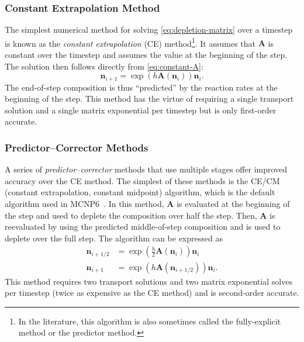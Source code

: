 \documentclass[3p,authoryear]{elsarticle}
\newcommand{\vect}[1]{\mathbf{#1}} %
\begin{document}
\subsubsection{Constant Extrapolation Method}

The simplest numerical method for solving \cref{eq:depletion-matrix} over a
timestep is known as the \emph{constant extrapolation} (CE) method\footnote{In
the literature, this algorithm is also sometimes called the fully-explicit
method or the predictor method.}. It assumes that $\vect{A}$ is constant over
the timestep and assumes the value at the beginning of the step. The solution
then follows directly from \cref{eq:constant-A}:
\begin{equation}
  \label{eq:constant_extrapolation}
  \vect{n}_{i+1} = \exp\left(h\vect{A}(\vect{n}_i) \right) \vect{n}_i.
\end{equation}
The end-of-step composition is thus ``predicted'' by the reaction rates at the
beginning of the step. This method has the virtue of requiring a single
transport solution and a single matrix exponential per timestep but is only
first-order accurate.

\subsubsection{Predictor--Corrector Methods}

A series of \emph{predictor--corrector} methods that use multiple stages offer
improved accuracy over the CE method. The simplest of these
methods is the CE/CM (constant extrapolation, constant midpoint) algorithm,
which is the default algorithm used in MCNP6~\citep{fensin2006tans}. In this
method, $\vect{A}$ is evaluated at the beginning of the step and used to deplete
the composition over half the step. Then, $\vect{A}$ is reevaluated by using the
predicted middle-of-step composition and is used to deplete over the full step.
The algorithm can be expressed as
\begin{equation}
  \begin{split}
    \vect{n}_{i+1/2} &= \exp \left (\frac{h}{2}\vect{A}(\vect{n}_i) \right) \vect{n}_i \\
    \vect{n}_{i+1} &= \exp \left(h \vect{A}(\vect{n}_{i+1/2}) \right) \vect{n}_i.
  \end{split}
\end{equation}
This method requires two transport solutions and two matrix exponential solves
per timestep (twice as expensive as the CE method) and is second-order
accurate.
\end{document}
